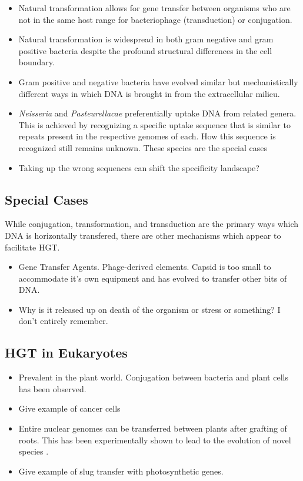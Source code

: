 \begin{itemize}
	\item Natural transformation allows for gene transfer between organisms
		who are not in the same host range for bacteriophage
		(transduction) or conjugation.
	\item Natural transformation is widespread in both gram negative and
		gram positive bacteria despite the profound structural
		differences in the cell boundary.
	\item Gram positive and negative bacteria have evolved similar but
		mechanistically different ways in which DNA is brought in from
		the extracellular milieu.

	\item \textit{Neisseria} and \textit{Pasteurellacae} preferentially uptake
		DNA from related genera. This is achieved by recognizing a
		specific uptake sequence that is similar to repeats present in
		the respective genomes of each. How this sequence is recognized
		still remains unknown. These species are the special cases
	\item Taking up the wrong sequences can shift the specificity landscape\cite{Mell:2014dj}?

\end{itemize}

\subsection*{Special Cases}
While conjugation, transformation, and transduction are the primary ways which
DNA is horizontally transfered, there are other mechanisms which appear to
facilitate HGT.
\begin{itemize}
	\item Gene Transfer Agents. Phage-derived elements. Capsid is too small
		to accommodate it's own equipment and has evolved to transfer
		other bits of DNA. 
	\item Why is it released up on death of the organism or stress or
		something? I don't entirely remember.
\end{itemize}


\subsection{HGT in Eukaryotes}
\begin{itemize}
	\item Prevalent in the plant world. Conjugation between bacteria and
		plant cells has been observed.
	\item Give example of cancer cells
	\item Entire nuclear genomes can be transferred between plants after
		grafting of roots. This has been experimentally shown to lead
		to the evolution of novel species \cite{Fuentes:2014kr}. 
	
	\item  Give example of slug transfer with photosynthetic genes.
\end{itemize}
